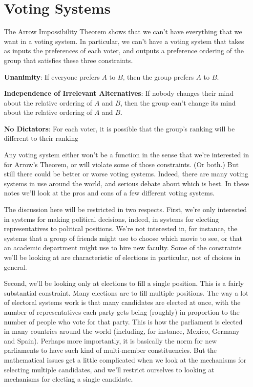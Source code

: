 \chapter{Voting Systems}

The Arrow Impossibility Theorem shows that we can't have everything that we want in a voting system. In particular, we can't have a voting system that takes as inputs the preferences of each voter, and outputs a preference ordering of the group that satisfies these three constraints.

\begin{enumerate*}
\item \textbf{Unanimity}: If everyone prefers $A$ to $B$, then the group prefers $A$ to $B$.
\item \textbf{Independence of Irrelevant Alternatives}: If nobody changes their mind about the relative ordering of $A$ and $B$, then the group can't change its mind about the relative ordering of $A$ and $B$.
\item \textbf{No Dictators}: For each voter, it is possible that the group's ranking will be different to their ranking
\end{enumerate*}

Any voting system either won't be a function in the sense that we're interested in for Arrow's Theorem, or will violate some of those constraints. (Or both.) But still there could be better or worse voting systems. Indeed, there are many voting systems in use around the world, and serious debate about which is best. In these notes we'll look at the pros and cons of a few different voting systems.

The discussion here will be restricted in two respects. First, we're only interested in systems for making political decisions, indeed, in systems for electing representatives to political positions. We're not interested in, for instance, the systems that a group of friends might use to choose which movie to see, or that an academic department might use to hire new faculty. Some of the constraints we'll be looking at are characteristic of elections in particular, not of choices in general.

Second, we'll be looking only at elections to fill a single position. This is a fairly substantial constraint. Many elections are to fill multiple positions. The way a lot of electoral systems work is that many candidates are elected at once, with the number of representatives each party gets being (roughly) in proportion to the number of people who vote for that party. This is how the parliament is elected in many countries around the world (including, for instance, Mexico, Germany and Spain). Perhaps more importantly, it is basically the norm for new parliaments to have such kind of multi-member constituencies. But the mathematical issues get a little complicated when we look at the mechanisms for selecting multiple candidates, and we'll restrict ourselves to looking at mechanisms for electing a single candidate.

